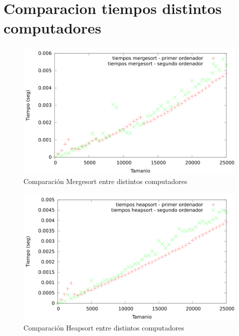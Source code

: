 \documentclass{article}
\begin{document}
	\section{Comparacion tiempos distintos computadores}
	
	\begin{figure}[h]
		\centering
		\includegraphics[totalheight=8cm]{img/compMergesort}
		\caption{Comparación Mergesort entre distintos computadores}
		\label{fig:compMergesort}
	\end{figure}
	
	\begin{figure}[h]
		\centering
		\includegraphics[totalheight=8cm]{img/compHeapsort}
		\caption{Comparación Heapsort entre distintos computadores}
		\label{fig:compHeapsort}
	\end{figure}
	
\end{document}
